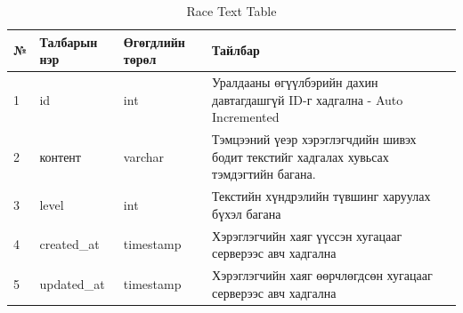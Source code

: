 \begin{table}[h]
	\caption{Race Text Table}
	\begin{tabular}{|l|l|l|p{8cm}|}
		\hline
		№ & Талбарын нэр & Өгөгдлийн төрөл & Тайлбар                                                                               \\ \hline
		1 & id           & int             & Уралдааны өгүүлбэрийн дахин давтагдашгүй ID-г хадгална - Auto Incremented             \\ \hline
		2 & контент      & varchar         & Тэмцээний үеэр хэрэглэгчдийн шивэх бодит текстийг хадгалах хувьсах тэмдэгтийн багана. \\ \hline
		3 & level        & int             & Текстийн хүндрэлийн түвшинг харуулах бүхэл багана                                     \\ \hline
		4 & created\_at  & timestamp       & Хэрэглэгчийн хаяг үүссэн хугацааг серверээс авч хадгална                              \\ \hline
		5 & updated\_at  & timestamp       & Хэрэглэгчийн хаяг өөрчлөгдсөн хугацааг серверээс авч хадгална                         \\ \hline
	\end{tabular}
\end{table}



\clearpage





